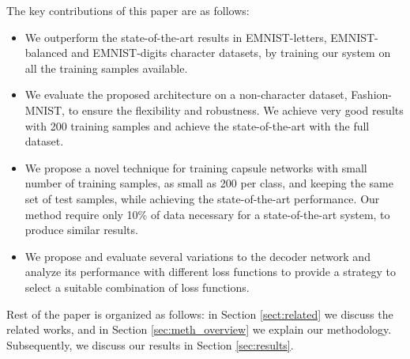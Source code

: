 The key contributions of this paper are as follows:

\begin{itemize}[noitemsep,nolistsep]
\item  We outperform the state-of-the-art results in EMNIST-letters, EMNIST-balanced and EMNIST-digits character datasets, by training our
system on all the training samples available.

\item We evaluate the proposed architecture on a non-character dataset, Fashion-MNIST, to ensure the
flexibility and robustness.  We achieve very good results with 200 training samples and achieve the state-of-the-art with the full dataset.

\item We propose a novel technique for training capsule networks with small number
of training samples, as small as 200 per class, and keeping the same set of
test samples, while achieving the state-of-the-art performance. Our method
require only 10\% of data necessary for a state-of-the-art system, to produce similar results.
 


\item  We propose and evaluate several variations to the decoder network and analyze
its performance with different loss functions to provide a strategy to
select a suitable combination of loss functions.
 

\end{itemize}

Rest of the paper is organized as follows: in Section \ref{sect:related} we discuss the related works, and in Section \ref{sec:meth_overview} we explain our methodology. Subsequently, we discuss our results in Section \ref{sec:results}.
